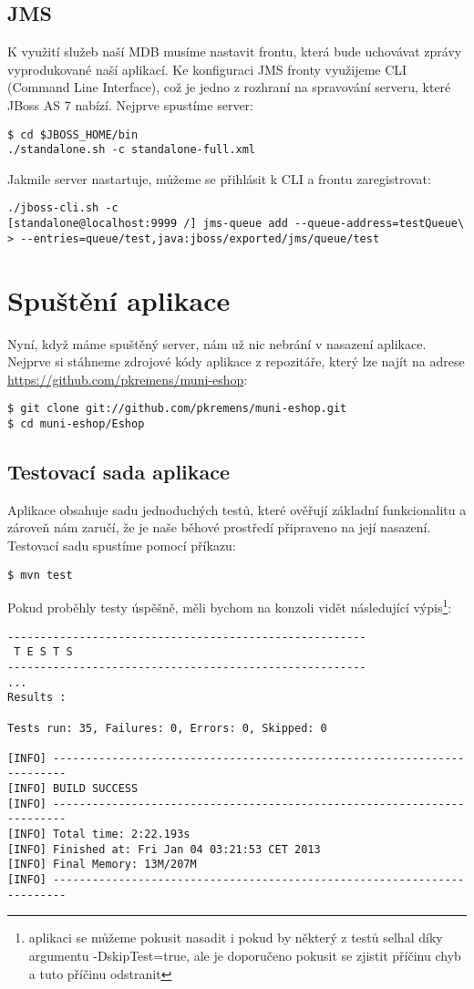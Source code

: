\documentclass[122pt,oneside]{fithesis}
\begin{document}
\subsection{JMS}
K využití služeb naší MDB musíme nastavit frontu, která bude uchovávat zprávy vyprodukované naší aplikací. Ke konfiguraci JMS fronty využijeme CLI (Command Line Interface), což je jedno z rozhraní na spravování serveru, které JBoss AS 7 nabízí. Nejprve spustíme server:
\begin{lstlisting}
$ cd $JBOSS_HOME/bin
./standalone.sh -c standalone-full.xml
\end{lstlisting}
Jakmile server nastartuje, můžeme se přihlásit k CLI a frontu zaregistrovat:
\begin{lstlisting}
./jboss-cli.sh -c
[standalone@localhost:9999 /] jms-queue add --queue-address=testQueue\
> --entries=queue/test,java:jboss/exported/jms/queue/test
\end{lstlisting}

\section{Spuštění aplikace}
Nyní, když máme spuštěný server, nám už nic nebrání v nasazení aplikace. Nejprve si stáhneme zdrojové kódy aplikace z repozitáře, který lze najít na adrese \href{https://github.com/pkremens/muni-eshop}{https://github.com/pkremens/muni-eshop}:
\begin{lstlisting}
$ git clone git://github.com/pkremens/muni-eshop.git
$ cd muni-eshop/Eshop
\end{lstlisting}

\subsection{Testovací sada aplikace}
Aplikace obsahuje sadu jednoduchých testů, které ověřují základní funkcionalitu a zároveň nám zaručí, že je naše běhové prostředí připraveno na její nasazení. 
Testovací sadu spustíme pomocí příkazu:
\begin{lstlisting}
$ mvn test
\end{lstlisting}
Pokud proběhly testy úspěšně, měli bychom na konzoli vidět následující výpis\footnote[1]{aplikaci se můžeme pokusit nasadit i pokud by některý z testů selhal díky argumentu -DskipTest=true, ale je doporučeno pokusit se zjistit příčinu chyb a tuto příčinu odstranit}:
\begin{lstlisting}
-------------------------------------------------------
 T E S T S
-------------------------------------------------------
...
Results :

Tests run: 35, Failures: 0, Errors: 0, Skipped: 0

[INFO] ------------------------------------------------------------------------
[INFO] BUILD SUCCESS
[INFO] ------------------------------------------------------------------------
[INFO] Total time: 2:22.193s
[INFO] Finished at: Fri Jan 04 03:21:53 CET 2013
[INFO] Final Memory: 13M/207M
[INFO] ------------------------------------------------------------------------
\end{lstlisting}
\end{document}
